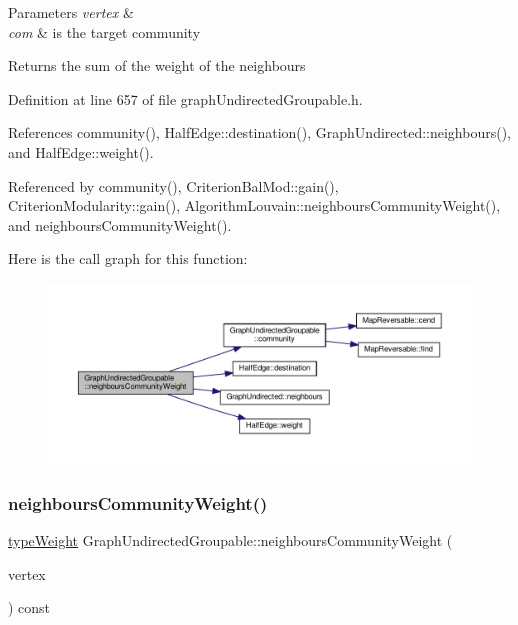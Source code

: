 \begin{DoxyParams}{Parameters}
{\em vertex} & \\
\hline
{\em com} & is the target community \\
\hline
\end{DoxyParams}
\begin{DoxyReturn}{Returns}
the sum of the weight of the neighbours 
\end{DoxyReturn}


Definition at line 657 of file graph\+Undirected\+Groupable.\+h.



References community(), Half\+Edge\+::destination(), Graph\+Undirected\+::neighbours(), and Half\+Edge\+::weight().



Referenced by community(), Criterion\+Bal\+Mod\+::gain(), Criterion\+Modularity\+::gain(), Algorithm\+Louvain\+::neighbours\+Community\+Weight(), and neighbours\+Community\+Weight().

Here is the call graph for this function\+:
\nopagebreak
\begin{figure}[H]
\begin{center}
\leavevmode
\includegraphics[width=350pt]{classGraphUndirectedGroupable_a23551b49c2cbf1b533e300af5c1f20da_cgraph}
\end{center}
\end{figure}
\mbox{\label{classGraphUndirectedGroupable_a41c4955a6238924a861fe18e8d7a9ee9}} 
\subsubsection{\texorpdfstring{neighbours\+Community\+Weight()}{neighboursCommunityWeight()}\hspace{0.1cm}{\footnotesize\ttfamily [2/2]}}
{\footnotesize\ttfamily \hyperlink{edge_8h_a2e7ea3be891ac8b52f749ec73fee6dd2}{type\+Weight} Graph\+Undirected\+Groupable\+::neighbours\+Community\+Weight (\begin{DoxyParamCaption}\item[{const \hyperlink{edge_8h_a5fbd20c46956d479cb10afc9855223f6}{type\+Vertex} \&}]{vertex }\end{DoxyParamCaption}) const\hspace{0.3cm}{\ttfamily [inline]}}

